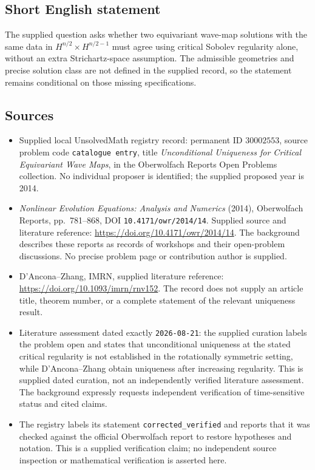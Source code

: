 \documentclass[11pt]{article}
\begin{document}
\subsection{Short English statement}
The supplied question asks whether two equivariant wave-map solutions with the same data in \(H^{n/2}\times H^{n/2-1}\) must agree using critical Sobolev regularity alone, without an extra Strichartz-space assumption. The admissible geometries and precise solution class are not defined in the supplied record, so the statement remains conditional on those missing specifications.
\subsection{Sources}
\begin{itemize}
\item Supplied local UnsolvedMath registry record: permanent ID \(30002553\), source problem code \texttt{catalogue entry}, title \emph{Unconditional Uniqueness for Critical Equivariant Wave Maps}, in the Oberwolfach Reports Open Problems collection. No individual proposer is identified; the supplied proposed year is 2014.
\item \emph{Nonlinear Evolution Equations: Analysis and Numerics} (2014), Oberwolfach Reports, pp.\ 781--868, DOI \texttt{10.4171/owr/2014/14}. Supplied source and literature reference: \url{https://doi.org/10.4171/owr/2014/14}. The background describes these reports as records of workshops and their open-problem discussions. No precise problem page or contribution author is supplied.
\item D'Ancona--Zhang, IMRN, supplied literature reference: \url{https://doi.org/10.1093/imrn/rnv152}. The record does not supply an article title, theorem number, or a complete statement of the relevant uniqueness result.
\item Literature assessment dated exactly \texttt{2026-08-21}: the supplied curation labels the problem open and states that unconditional uniqueness at the stated critical regularity is not established in the rotationally symmetric setting, while D'Ancona--Zhang obtain uniqueness after increasing regularity. This is supplied dated curation, not an independently verified literature assessment. The background expressly requests independent verification of time-sensitive status and cited claims.
\item The registry labels its statement \texttt{corrected\_verified} and reports that it was checked against the official Oberwolfach report to restore hypotheses and notation. This is a supplied verification claim; no independent source inspection or mathematical verification is asserted here.
\end{itemize}
\end{document}

